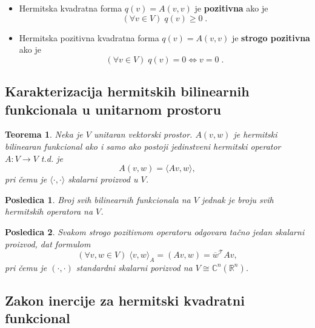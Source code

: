 \documentclass[a4paper,12pt,twoside]{report}
\newtheorem{theorem}{Teorema}[section]
\newtheorem{corollary}{Posledica}[theorem]
\numberwithin{algorithm}{section}
\begin{document}
\begin{itemize}
    \item Hermitska kvadratna forma $q(v) = A(v, v)$ je \textbf{pozitivna} ako je 
    \[ (\forall v \in V) \; q(v) \geq 0\;. \]
    \item Hermitska pozitivna kvadratna forma $q(v) = A(v, v)$ je \textbf{strogo pozitivna} ako je 
    \[ (\forall v \in V) \; q(v) = 0 \iff v = 0\;. \]
\end{itemize}
\newpage
\subsection{Karakterizacija hermitskih bilinearnih funkcionala u unitarnom prostoru}

\begin{theorem}
    Neka je $V$ unitaran vektorski prostor. $A(v, w)$ je hermitski bilinearan funkcional ako i samo ako postoji jedinstveni 
    hermitski operator $A:V \to V$ t.d. je 
    \[ A(v, w) = \langle Av, w \rangle, \] pri čemu je $\langle \cdot, \cdot \rangle$ skalarni proizvod u $V$.
\end{theorem}

\begin{corollary}
    Broj svih bilinearnih funkcionala na $V$ jednak je broju svih hermitskih operatora na $V$.
\end{corollary}

\begin{corollary}
    Svakom strogo pozitivnom operatoru odgovara tačno jedan skalarni proizvod, dat formulom
    \[ (\forall v, w \in V)\;\langle v, w \rangle_A = (Av, w) = \overline{w}^\mathcal{T} A v, \]
    pri čemu je $(\cdot, \cdot)$ standardni skalarni porizvod na $V \cong \mathbb{C}^n (\mathbb{R}^n)$.
\end{corollary}

\subsection{Zakon inercije za hermitski kvadratni funkcional}
\end{document}
